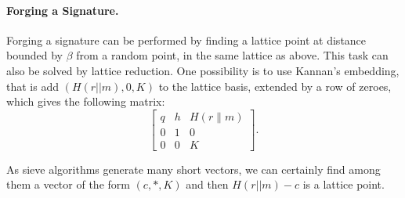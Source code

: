 \paragraph{Forging a Signature.} Forging a signature can be performed by finding a lattice point at distance bounded by $\beta$ from a random point, in the same lattice as above. 
This task can also be solved by lattice reduction. 
One possibility is to use Kannan's embedding, that is add $(H(r||m), 0, K)$ to the lattice basis, 
extended by a row of zeroes, which gives the following matrix: 
\[ \left[
\begin{array}{c|c|c}
q  & h & H(r\| m) \\
\hline
0 & 1 & 0 \\
\hline
0 & 0 & K
\end{array}
\right].
\]

\iffalse
$(2n+1) \times (2n+1)$ matrix:
%
\newcommand{\toto}[1]{\multicolumn{3}{c|}{\multirow{3}{*}{#1}}}
\[
\renewcommand{\arraycolsep}{2.5mm}
\left[
\begin{array}{ccc|ccc|c}
\toto{$\matI_n$} & \toto{$0$} & \multirow{3}{*}{0}\\
&&&&&& \\
&&&&&& \\
\hline
\toto{$\cC(h)$} & \toto{$q \matI_n$} & \multirow{3}{*}{0}\\
&&&&&& \\
&&&&&& \\
\hline
\multicolumn{3}{c|}{H(\salt \| \msg)} & \multicolumn{3}{c|}{0} & 1
\end{array}
\right],
\]
where $\cC(h)$ is the $n \times n$ matrix which $i$-th row is the vector of coefficients of $x^{i-1} \cdot h \bmod (x^n + 1)$. 
\fi
%

As sieve algorithms generate many short vectors, we can certainly find among them a vector of the 
form $(c,*, K)$ and then $H(r||m)-c$ is a lattice point.

